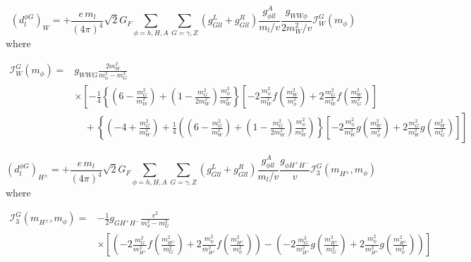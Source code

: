 \begin{equation}\label{eq:BarrZee-phiG-Wloop}
	(d^{\phi G}_{l})_{W} = +\frac{e\,m_{l}}{(4\pi)^{4}}\sqrt{2}G_{F}\sum_{\phi=h,H,A}\sum_{G=\gamma,Z}(g_{Gll}^{L}+g_{Gll}^{R})\frac{g_{\phi ll}^{A}}{m_{l}/v}\frac{g_{WW\phi}}{2m_{W}^{2}/v}\mathcal{I}_{W}^{G}(m_{\phi})
\end{equation}
where
\begin{adjustwidth}{-2.5cm}{-2.5cm}
	\begin{align}
	\mathcal{I}_{W}^{G}(m_{\phi}) = &g_{WWG}\frac{2m_{W}^{2}}{m_{\phi}^{2}-m_{G}^{2}} \nonumber \\
	& \times \left[-\frac{1}{4}\left\{\left(6-\frac{m_{G}^{2}}{m_{W}^{2}}\right) + \left(1-\frac{m_{G}^{2}}{2m_{W}^{2}}\right)\frac{m_{\phi}^{2}}{m_{W}^{2}}\right\}
	\left[-2\frac{m_{\phi}^{2}}{m_{W}^{2}} f\left(\frac{m_{W}^{2}}{m_{\phi}^{2}}\right) + 2\frac{m_{G}^{2}}{m_{W}^{2}} f\left(\frac{m_{W}^{2}}{m_{G}^{2}}\right)\right]\right. \nonumber \\
	&\left. \quad + \left\{\left(-4+\frac{m_{G}^{2}}{m_{W}^{2}}\right) + \frac{1}{4}\left(\left(6-\frac{m_{G}^{2}}{m_{W}^{2}}\right) + \left(1-\frac{m_{G}^{2}}{2m_{W}^{2}}\right)\frac{m_{\phi}^{2}}{m_{W}^{2}}\right)\right\}
	\left[-2\frac{m_{\phi}^{2}}{m_{W}^{2}} g\left(\frac{m_{W}^{2}}{m_{\phi}^{2}}\right) + 2\frac{m_{G}^{2}}{m_{W}^{2}} g\left(\frac{m_{W}^{2}}{m_{G}^{2}}\right)\right]\right]
	\end{align}
\end{adjustwidth}

\begin{equation}\label{eq:BarrZee-phiG-cHloop}
	(d^{\phi G}_{l})_{H^{\pm}} = +\frac{e\,m_{l}}{(4\pi)^{4}}\sqrt{2}G_{F}\sum_{\phi=h,H,A}\sum_{G=\gamma,Z}(g_{Gll}^{L}+g_{Gll}^{R})\frac{g_{\phi ll}^{A}}{m_{l}/v}\frac{g_{\phi H^{+}H^{-}}}{v}\mathcal{I}_{3}^{G}(m_{H^{\pm}}, m_{\phi})
\end{equation}
where
\begin{adjustwidth}{-2.5cm}{-2.5cm}
	\begin{align}
	\mathcal{I}_{3}^{G}(m_{H^{\pm}}, m_{\phi}) =& -\frac{1}{2}g_{GH^{+}H^{-}}\frac{v^{2}}{m_{\phi}^{2}-m_{G}^{2}} \nonumber \\
	& \times \left[\left(-2\frac{m_{G}^{2}}{m_{H^{\pm}}^{2}} f\left(\frac{m_{H^{\pm}}^{2}}{m_{G}^{2}}\right) + 2\frac{m_{\phi}^{2}}{m_{H^{\pm}}^{2}} f\left(\frac{m_{H^{\pm}}^{2}}{m_{\phi}^{2}}\right)\right)
	-\left(-2\frac{m_{G}^{2}}{m_{H^{\pm}}^{2}} g\left(\frac{m_{H^{\pm}}^{2}}{m_{G}^{2}}\right) + 2\frac{m_{\phi}^{2}}{m_{H^{\pm}}^{2}} g\left(\frac{m_{H^{\pm}}^{2}}{m_{\phi}^{2}}\right)\right)\right]
	\end{align}
\end{adjustwidth}

